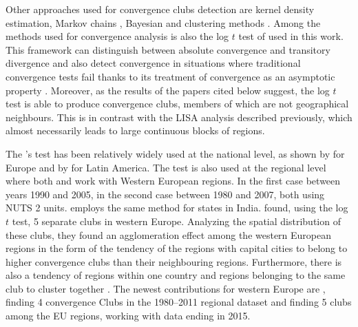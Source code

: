 \documentclass[11pt]{article}
\begin{document}
Other approaches used for convergence clubs detection are kernel density estimation, Markov chains \citep{eckey2007convergence}, Bayesian \citep{fischer2015bayesian} and clustering methods \citep{maasoumi2008economic}. 
Among the methods used for convergence analysis is also the log $t$ test of \citet{phillips2007transition} used in this work. This framework can distinguish between absolute convergence and transitory divergence and also detect convergence in situations where traditional convergence tests fail thanks to its treatment of convergence as an asymptotic property \citep{bartkowska2012regional, borsi2015evolution}.
Moreover, as the results of the papers cited below suggest, the log $t$ test is able to produce convergence clubs, members of which are not geographical neighbours. This is in contrast with the LISA analysis described previously, which almost necessarily leads to large continuous blocks of regions.

The \cite{phillips2007transition}'s test
has been relatively widely used at the national level, as shown by \citet{borsi2015evolution, fritsche2011analysing, monfort2013real,apergis2010old} for Europe and by \citet{rodriguez2014there} for Latin America. The test is also used at the regional level where both \citet{bartkowska2012regional} and \citet{pinho2010regional} work with Western European regions. In the first case between years 1990 and 2005, in the second case between 1980 and 2007, both using NUTS 2 units. \citet{ghosh2013regional} employs the same method for states in India. \citet{bartkowska2012regional} found, using the log $t$ test, 5 separate clubs in western Europe. Analyzing the spatial distribution of these clubs, they found an agglomeration effect among the western European regions in the form of the tendency of the regions with capital cities to belong to higher convergence clubs than their neighbouring regions. Furthermore, there is also a tendency of regions within one country and regions belonging to the same club to cluster together \citep{bartkowska2012regional}. The newest contributions for western Europe are \citet{von2017regional}, finding 4 convergence Clubs in the 1980–2011 regional dataset and \citet{cutrini2019economic} finding 5 clubs among the EU regions, working with data ending in 2015. 
\end{document}
